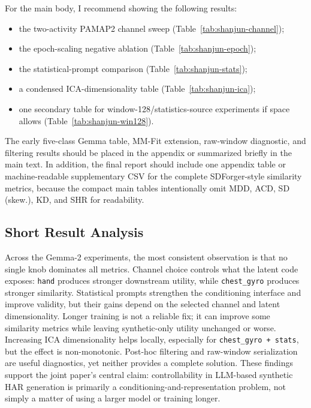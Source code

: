 For the main body, I recommend showing the following results:
\begin{itemize}
  \item the two-activity PAMAP2 channel sweep
  (Table~\ref{tab:shanjun-channel});
  \item the epoch-scaling negative ablation
  (Table~\ref{tab:shanjun-epoch});
  \item the statistical-prompt comparison
  (Table~\ref{tab:shanjun-stats});
  \item a condensed ICA-dimensionality table
  (Table~\ref{tab:shanjun-ica});
  \item one secondary table for window-128/statistics-source experiments if space
  allows (Table~\ref{tab:shanjun-win128}).
\end{itemize}
The early five-class Gemma table, MM-Fit extension, raw-window diagnostic, and
filtering results should be placed in the appendix or summarized briefly in the
main text. In addition, the final report should include one appendix table or
machine-readable supplementary CSV for the complete SDForger-style similarity
metrics, because the compact main tables intentionally omit MDD, ACD, SD
(skew.), KD, and SHR for readability.

\subsection*{Short Result Analysis}

Across the Gemma-2 experiments, the most consistent observation is that no single
knob dominates all metrics. Channel choice controls what the latent code exposes:
\texttt{hand} produces stronger downstream utility, while \texttt{chest\_gyro}
produces stronger similarity. Statistical prompts strengthen the conditioning
interface and improve validity, but their gains depend on the selected channel
and latent dimensionality. Longer training is not a reliable fix; it can improve
some similarity metrics while leaving synthetic-only utility unchanged or worse.
Increasing ICA dimensionality helps locally, especially for
\texttt{chest\_gyro + stats}, but the effect is non-monotonic. Post-hoc
filtering and raw-window serialization are useful diagnostics, yet neither
provides a complete solution. These findings support the joint paper's central
claim: controllability in LLM-based synthetic HAR generation is primarily a
conditioning-and-representation problem, not simply a matter of using a larger
model or training longer.
